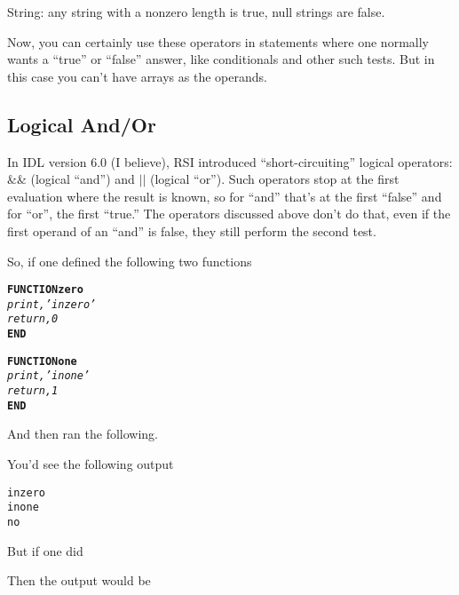    \item String: any string with a nonzero length is true, null strings are false.

  \ei
  \normalfont

  Now, you can certainly use these operators in statements where one
  normally wants a ``true'' or ``false'' answer, like conditionals and
  other such tests. But in this case you can't have arrays as the
  operands. 


\subsection{Logical And/Or}\label{sec:qs-and-or}

In IDL version 6.0 (I believe), RSI introduced ``short-circuiting''
logical operators: \&\& (logical ``and'') and $||$  (logical ``or''). Such
operators stop at the first evaluation where the result is known, so for
``and'' that's at the first ``false'' and for ``or'', the first
``true.''  The operators discussed above don't do that, even if the
first operand of an ``and'' is false, they still perform the second
test. 

\newpage

So, if one defined the following two functions

\begin{alltt}
 \textbf{FUNCTION zero }
  \textit{print,'in zero'}
  \textit{return,0}
 \textbf{END}
\end{alltt}

\begin{alltt}
 \textbf{FUNCTION one }
  \textit{print,'in one'}
  \textit{return,1}
 \textbf{END}
\end{alltt}

  And then ran the following.


  You'd see the following output


\begin{alltt}
       in zero
       in one
       no
\end{alltt}


   But if one did


  Then the output would be



